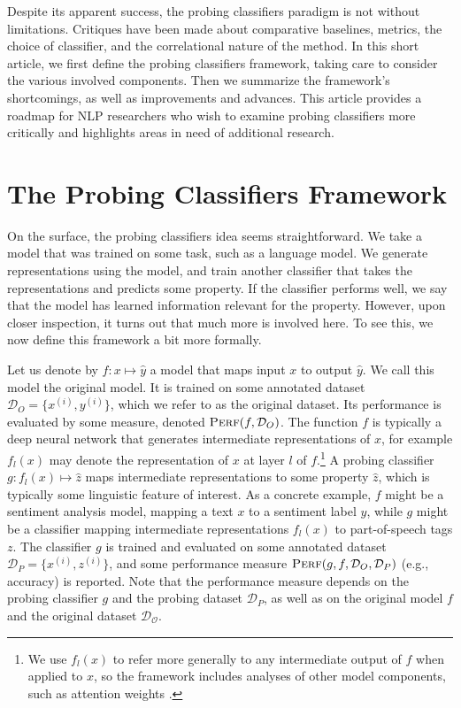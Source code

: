 \documentclass[discussion]{clv3}
\begin{document}
Despite its apparent success, the probing classifiers paradigm is not without limitations. Critiques have been made about comparative baselines, metrics, the choice of classifier, and the correlational nature of the method. In this short article, we first define the probing classifiers framework, taking care to consider the various involved components. Then we summarize the framework's shortcomings, as well as improvements and advances. 
This article provides a roadmap for NLP researchers who wish to examine probing classifiers more critically and highlights areas in need of additional research. 


\section{The Probing Classifiers Framework} \label{sec:framework} 



On the surface, the probing classifiers idea seems straightforward. We take a model that was trained on some task, such as a language model. We generate representations using the model, and train another classifier that takes the representations and predicts some property. If the classifier performs well, we say that the model has learned information relevant for the property. 
%
However, upon closer inspection, it turns out that much more is involved here. To see this, we now define this framework a bit more formally. 

Let us denote by $f : x \mapsto \hat{y}$ a model that maps input $x$ to output $\hat{y}$. We call this model the original model. It is trained on some annotated dataset $\mathcal{D}_O = \{x^{(i)}, y^{(i)}\}$, which we refer to as the original dataset. Its performance is evaluated by some measure, denoted $\textsc{Perf}(f, \mathcal{D}_O)$.
The function $f$ is typically a deep neural network that generates intermediate representations of $x$, for example $f_l(x)$ may denote the representation of $x$ at layer $l$ of $f$.\footnote{We use $f_l(x)$ to refer more generally to any intermediate output of $f$ when applied to $x$, so the framework includes analyses of other model components, such as attention weights \cite{clark-etal-2019-bert}.} 
A probing classifier $g : f_l(x) \mapsto \hat{z}$ maps intermediate representations to some property $\hat{z}$, which is typically some linguistic feature of interest. 
As a concrete example, $f$ might be a sentiment analysis model, mapping a text $x$ to a sentiment label  $y$, while $g$ might be a classifier mapping intermediate representations $f_l(x)$ to part-of-speech tags $z$.
The classifier $g$ is trained and evaluated on some annotated dataset $\mathcal{D}_P = \{x^{(i)}, z^{(i)}\}$, and some performance measure $\textsc{Perf}(g, f, \mathcal{D}_O, \mathcal{D}_P)$ (e.g., accuracy) is reported. Note that the performance measure depends on the probing classifier $g$ and the probing dataset $\mathcal{D}_P$, as well as on the original model $f$ and the original dataset $\mathcal{D_O}$.  
\end{document}
